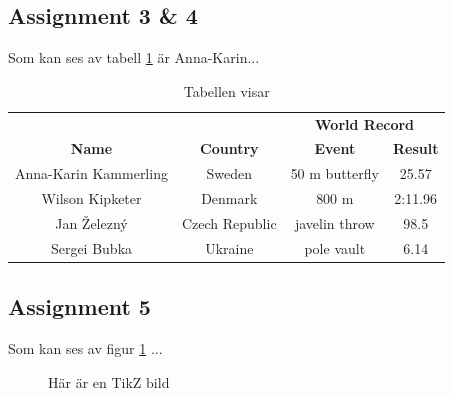\documentclass[a4paper,12pt]{article}
\begin{document}
\subsection{Assignment 3 \& 4}
Som kan ses av tabell \ref{tab:records} är Anna-Karin... 
\begin{table}[htbp]
	\centering
	\begin{tabular}{c c c c}
		\hline 
		& & \multicolumn{2}{c}{\textbf{World Record}} \\ \cline{3-4}
		\bfseries{Name} & \bfseries{Country} & \bfseries{Event} & 				\bfseries{Result} \\ 
		\hline 
		Anna-Karin Kammerling & Sweden & 50 m butterfly & 25.57 \\ 
		Wilson Kipketer & Denmark & 800 m & 2:11.96 \\ 
		Jan \v{Z}elezný & Czech Republic & javelin throw & 98.5 \\ 
		Sergei Bubka & Ukraine & pole vault & 6.14 \\ 
		\hline 
	\end{tabular} 
	\caption{Tabellen visar}
	\label{tab:records}
\end{table}
\subsection{Assignment 5}
Som kan ses av figur \ref{f:tikz} ...
\begin{figure}[htbp]
	\centering
	\caption{Här är en TikZ bild }
	\label{f:tikz}
\end{figure}
\end{document}
